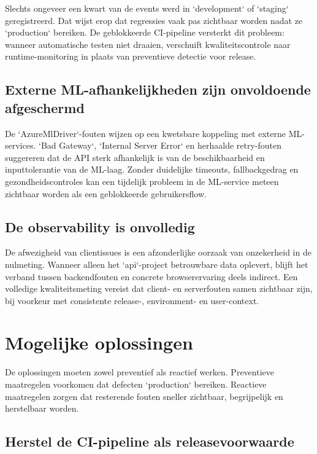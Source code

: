 Slechts ongeveer een kwart van de events werd in `development` of `staging` geregistreerd. Dat wijst erop dat regressies vaak pas zichtbaar worden nadat ze `production` bereiken. De geblokkeerde CI-pipeline versterkt dit probleem: wanneer automatische testen niet draaien, verschuift kwaliteitscontrole naar runtime-monitoring in plaats van preventieve detectie voor release.

\subsection{Externe ML-afhankelijkheden zijn onvoldoende afgeschermd}

De `AzureMlDriver`-fouten wijzen op een kwetsbare koppeling met externe ML-services. `Bad Gateway`, `Internal Server Error` en herhaalde retry-fouten suggereren dat de API sterk afhankelijk is van de beschikbaarheid en inputtolerantie van de ML-laag. Zonder duidelijke timeouts, fallbackgedrag en gezondheidscontroles kan een tijdelijk probleem in de ML-service meteen zichtbaar worden als een geblokkeerde gebruikersflow.

\subsection{De observability is onvolledig}

De afwezigheid van clientissues is een afzonderlijke oorzaak van onzekerheid in de nulmeting. Wanneer alleen het `api`-project betrouwbare data oplevert, blijft het verband tussen backendfouten en concrete browserervaring deels indirect. Een volledige kwaliteitsmeting vereist dat client- en serverfouten samen zichtbaar zijn, bij voorkeur met consistente release-, environment- en user-context.

\section{Mogelijke oplossingen}

De oplossingen moeten zowel preventief als reactief werken. Preventieve maatregelen voorkomen dat defecten `production` bereiken. Reactieve maatregelen zorgen dat resterende fouten sneller zichtbaar, begrijpelijk en herstelbaar worden.

\subsection{Herstel de CI-pipeline als releasevoorwaarde}

